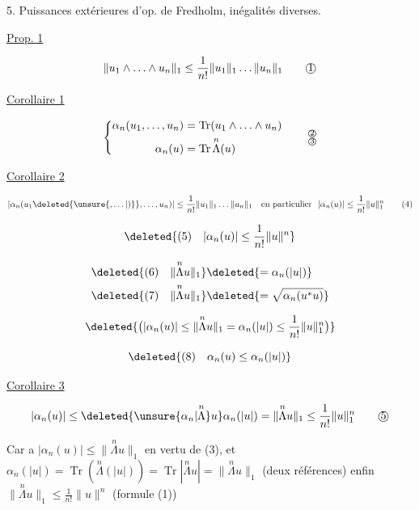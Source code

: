 5.\unsure{)} Puissances extérieures d'op. de Fredholm, inégalités diverses.

\uline{Prop. 1}

\[
\lVert u_1\wedge\ldots\wedge u_n\rVert_1\leq\frac1{n!}\lVert u_1\rVert_1\ldots\lVert u_n\rVert_1\tag*{\textcircled{1}}
\]

\uline{Corollaire 1}

\[
\left\{\begin{aligned}
\alpha_n(u_1,\ldots,u_n)&=\operatorname{Tr}(u_1\wedge\ldots\wedge u_n)\\
\alpha_n(u)&=\operatorname{Tr}\overset{n}{\Lambda}(u)
\end{aligned}\right.\tag*{$\substack{\text{\textcircled{2}}\\\text{\textcircled{3}}}$}
\]

\uline{Corollaire 2}

\[
|\alpha_n(u_1\deleted{\unsure{,\ldots|)}},\ldots,u_n)|\leq\frac1{n!}\lVert u_1\rVert_1\ldots\lVert u_n\rVert_1\quad\text{en particulier }\ |\alpha_n(u)|\leq\frac1{n!}\lVert u\rVert_1^n\tag*{(4)}
\]

\[
\deleted{(5)\quad|\alpha_n(u)|\leq\frac1{n!}\lVert u\rVert^{n}}
\]


\[
\begin{aligned}
\deleted{(6)\quad\lVert\overset{n}{\Lambda}u\rVert_1}&\deleted{=\alpha_n(|u|)}\\
\deleted{(7)\quad\lVert\overset{n}{\Lambda}u\rVert_1}&\deleted{=\sqrt{\alpha_n(u^*u)}}
\end{aligned}
\]

\[
\deleted{\bigl(|\alpha_n(u)|\leq\lVert\overset{n}{\Lambda}u\rVert_1=\alpha_n(|u|)\leq\frac1{n!}\lVert u\rVert_1^n\bigr)}
\]


\[
\deleted{(8)\quad\alpha_n(u)\leq\alpha_n(|u|)}
\]

\uline{Corollaire 3}

\[
|\alpha_n(u)|\leq\deleted{\unsure{\alpha_n|\overset{n}{\Lambda}}u}\alpha_n(|u|)=\lVert\overset{n}{\Lambda}u\rVert_1\leq\frac1{n!}\lVert u\rVert_1^n\tag*{\textcircled{5}}
\]

Car a $|\alpha_n(u)|\leq\lVert\overset{n}{\Lambda}u\rVert_1$ en vertu de (3), et $\alpha_n(|u|)=\operatorname{Tr}(\overset{n}{\Lambda}(|u|))=\operatorname{Tr}|\overset{n}{\Lambda}u|=\lVert\overset{n}{\Lambda}u\rVert_1$ (deux références) enfin $\lVert\overset{n}{\Lambda}u\rVert_1\leq\frac1{n!}\lVert u\rVert^n$ (formule (1))

